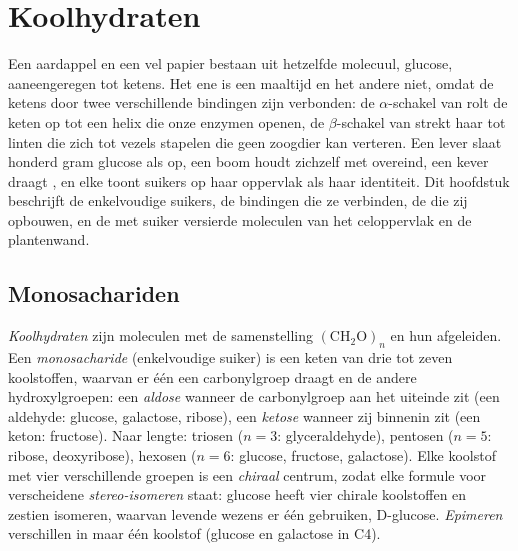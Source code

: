 \chapter{Koolhydraten}\label{ch:b1:carbohydrates}

Een aardappel en een vel papier bestaan uit hetzelfde molecuul, glucose,
aaneengeregen tot ketens. Het ene is een maaltijd en het andere niet, omdat de
ketens door twee verschillende bindingen zijn verbonden: de $\alpha$-schakel van
 rolt de keten op tot een helix die onze enzymen openen, de
$\beta$-schakel van  strekt haar tot linten die zich tot vezels stapelen
die geen zoogdier kan verteren. Een lever slaat honderd gram glucose als
 op, een boom houdt zichzelf met  overeind, een kever draagt
, en elke  toont suikers op haar oppervlak als haar identiteit. Dit
hoofdstuk beschrijft de enkelvoudige suikers, de bindingen die ze verbinden, de
 die zij opbouwen, en de met suiker versierde moleculen van het
celoppervlak en de plantenwand.

\section{Monosachariden}

\begin{definition}[Monosacharide]\label{def:b1:carbohydrates:monosaccharide}
\emph{Koolhydraten} zijn moleculen met de samenstelling
$(\mathrm{CH_2O})_n$ en hun afgeleiden. Een
\emph{monosacharide} (enkelvoudige suiker) is een keten van
drie tot zeven koolstoffen, waarvan er één een carbonylgroep draagt en de andere
hydroxylgroepen: een \emph{aldose} wanneer de carbonylgroep aan het
uiteinde zit (een aldehyde: glucose, galactose, ribose), een
\emph{ketose} wanneer zij binnenin zit (een keton: fructose). Naar
lengte: triosen ($n = 3$: glyceraldehyde), pentosen ($n = 5$: ribose,
deoxyribose), hexosen ($n = 6$: glucose, fructose, galactose). Elke koolstof met
vier verschillende groepen is een \emph{chiraal} centrum, zodat elke formule voor
verscheidene \emph{stereo-isomeren} staat: glucose heeft vier chirale koolstoffen
en zestien isomeren, waarvan levende wezens er één gebruiken, D-glucose.
\emph{Epimeren} verschillen in maar één koolstof (glucose en galactose in C4).
\end{definition}

